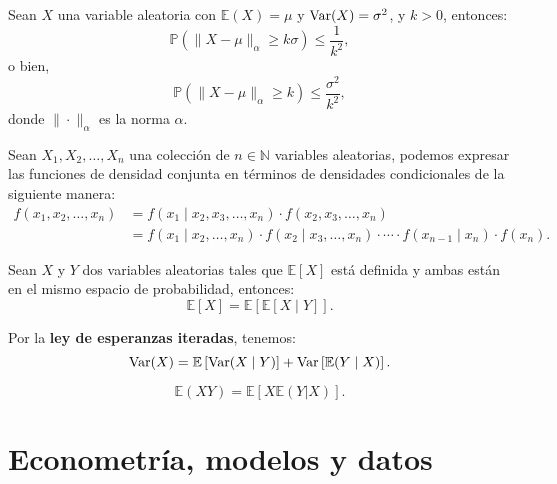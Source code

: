 \documentclass[8pt,a4paper]{extarticle}
\begin{document}
\begin{multicols}{3}
\begin{boxtheo}
	Sean $X$ una variable aleatoria con $\mathbb{E}(X) = \mu$ y $\text{\normalfont Var}(X) = \sigma^2$, y $k > 0$, entonces:
	\[
		\mathbb{P}\left( \|X - \mu\|_{\alpha} \ge k\sigma \right) \le \frac{1}{k^2}
	,\] 
	o bien,
	\[
		\mathbb{P}\left( \|X - \mu\|_{\alpha} \ge k \right) \le \frac{\sigma^2}{k^2}
	,\] 
	donde $\| \cdot \|_{\alpha}$ es la norma $\alpha$.
\end{boxtheo}

\begin{boxrmk}[]
	Sean $X_1, X_2, \ldots, X_n$ una colección de $n\in\mathbb{N}$ variables aleatorias, podemos expresar las funciones de densidad conjunta en términos de densidades condicionales de la siguiente manera:
	\begin{align*}
		f(x_1, x_2, \ldots, x_n) &= f(x_1  \mid x_2, x_3, \ldots, x_n)\cdot  f(x_2, x_3, \ldots, x_n) \\
								 &=  f(x_1  \mid x_2, \ldots, x_n) \cdot f(x_2  \mid x_3, \ldots, x_n) \cdot \cdots \cdot f(x_{n-1}  \mid x_n) \cdot f(x_{n})
	.\end{align*}
\end{boxrmk}

\begin{boxtheo}
	Sean $X$ y $Y$ dos variables aleatorias tales que $\mathbb{E}\left[ X \right] $ está definida y ambas están en el mismo espacio de probabilidad, entonces:
	\[
		\mathbb{E}\left[ X \right] = \mathbb{E}\left[ \mathbb{E}\left[ X  \mid Y \right]  \right] 
	.\] 
\end{boxtheo}

\begin{boxprop}[]
	Por la \textbf{ley de esperanzas iteradas}, tenemos:
	\[
		\text{\normalfont Var}(X) = \mathbb{E}\left[ \text{\normalfont Var}(X  \mid Y) \right] + \text{\normalfont Var} \left[ \mathbb{E}(Y  \mid X) \right] 
	.\] 
\end{boxprop}

\begin{boxprop}[]
	\[
		\mathbb{E}(XY) = \mathbb{E}\left[ X \mathbb{E}(Y | X) \right] 
	.\] 
\end{boxprop}



\newpage
\section{Econometría, modelos y datos}


\end{multicols}
\end{document}
